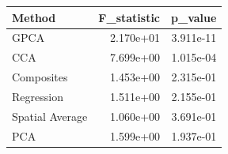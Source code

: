 \begin{tabular}{lrr}
\toprule
Method & F_statistic & p_value \\
\midrule
GPCA & 2.170e+01 & 3.911e-11 \\
CCA & 7.699e+00 & 1.015e-04 \\
Composites & 1.453e+00 & 2.315e-01 \\
Regression & 1.511e+00 & 2.155e-01 \\
Spatial Average & 1.060e+00 & 3.691e-01 \\
PCA & 1.599e+00 & 1.937e-01 \\
\bottomrule
\end{tabular}
